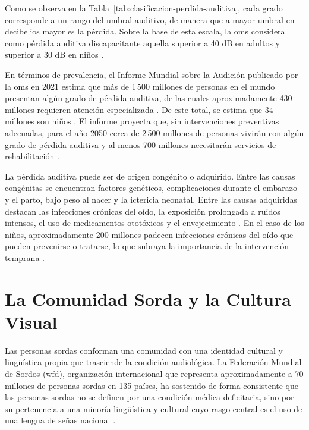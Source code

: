 Como se observa en la Tabla~\ref{tab:clasificacion-perdida-auditiva}, cada grado
corresponde a un rango del umbral auditivo, de manera que a mayor umbral en decibelios
mayor es la pérdida. Sobre la base de esta escala, la \acrshort{oms} considera como pérdida
auditiva discapacitante aquella superior a 40 dB en adultos y superior a 30 dB en niños \cite{who_deafness_2024}.

En términos de prevalencia, el Informe Mundial sobre la Audición publicado por la \acrshort{oms}
en 2021 estima que más de 1\,500 millones de personas en el mundo presentan algún grado
de pérdida auditiva, de las cuales aproximadamente 430 millones requieren atención
especializada \cite{who_world_report_2021}. De este total, se estima que 34 millones son niños \cite{who_deafness_2024}. El informe proyecta
que, sin intervenciones preventivas adecuadas, para el año 2050 cerca de 2\,500 millones de
personas vivirán con algún grado de pérdida auditiva y al menos 700 millones necesitarán
servicios de rehabilitación \cite{who_world_report_2021}.

La pérdida auditiva puede ser de origen congénito o adquirido. Entre las causas congénitas
se encuentran factores genéticos, complicaciones durante el embarazo y el parto, bajo peso
al nacer y la ictericia neonatal. Entre las causas adquiridas destacan las infecciones crónicas
del oído, la exposición prolongada a ruidos intensos, el uso de medicamentos ototóxicos y
el envejecimiento \cite{who_deafness_2024}. En el caso de los niños, aproximadamente 200 millones padecen
infecciones crónicas del oído que pueden prevenirse o tratarse, lo que subraya la
importancia de la intervención temprana \cite{who_world_report_2021}.

\section{La Comunidad Sorda y la Cultura Visual}

Las personas sordas conforman una comunidad con una identidad cultural y lingüística
propia que trasciende la condición audiológica. La Federación Mundial de Sordos (\acrshort{wfd}),
organización internacional que representa aproximadamente a 70 millones de personas
sordas en 135 países, ha sostenido de forma consistente que las personas sordas no se
definen por una condición médica deficitaria, sino por su pertenencia a una minoría
lingüística y cultural cuyo rasgo central es el uso de una lengua de señas nacional \cite{wfd_cultural_2018}.

